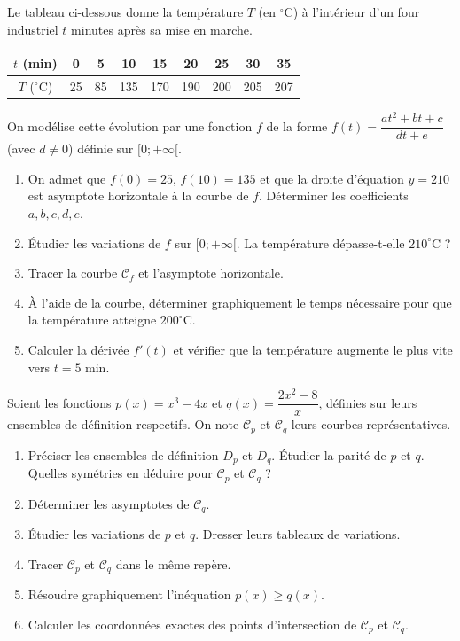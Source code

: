 \documentclass[11pt]{article}
\begin{document}
\begin{exercice}
Le tableau ci-dessous donne la température $T$ (en $^\circ$C) à l'intérieur d'un four industriel $t$ minutes après sa mise en marche.

\begin{center}
\begin{tabular}{|c|c|c|c|c|c|c|c|c|}
\hline
$t$ (min) & 0 & 5 & 10 & 15 & 20 & 25 & 30 & 35 \\
\hline
$T$ ($^\circ$C) & 25 & 85 & 135 & 170 & 190 & 200 & 205 & 207 \\
\hline
\end{tabular}
\end{center}

On modélise cette évolution par une fonction $f$ de la forme $f(t) = \dfrac{at^2 + bt + c}{dt + e}$ (avec $d \neq 0$) définie sur $[0; +\infty[$.
\begin{enumerate}
    \item On admet que $f(0)=25$, $f(10)=135$ et que la droite d'équation $y = 210$ est asymptote horizontale à la courbe de $f$. Déterminer les coefficients $a, b, c, d, e$.
    \item Étudier les variations de $f$ sur $[0; +\infty[$. La température dépasse-t-elle $210^\circ$C ?
    \item Tracer la courbe $\mathcal{C}_f$ et l'asymptote horizontale.
    \item À l'aide de la courbe, déterminer graphiquement le temps nécessaire pour que la température atteigne $200^\circ$C.
    \item Calculer la dérivée $f'(t)$ et vérifier que la température augmente le plus vite vers $t = 5$ min.
\end{enumerate}
\end{exercice}

\begin{exercice}
Soient les fonctions $p(x) = x^3 - 4x$ et $q(x) = \dfrac{2x^2 - 8}{x}$, définies sur leurs ensembles de définition respectifs. On note $\mathcal{C}_p$ et $\mathcal{C}_q$ leurs courbes représentatives.
\begin{enumerate}
    \item Préciser les ensembles de définition $D_p$ et $D_q$. Étudier la parité de $p$ et $q$. Quelles symétries en déduire pour $\mathcal{C}_p$ et $\mathcal{C}_q$ ?
    \item Déterminer les asymptotes de $\mathcal{C}_q$.
    \item Étudier les variations de $p$ et $q$. Dresser leurs tableaux de variations.
    \item Tracer $\mathcal{C}_p$ et $\mathcal{C}_q$ dans le même repère.
    \item Résoudre graphiquement l'inéquation $p(x) \geqslant q(x)$.
    \item Calculer les coordonnées exactes des points d'intersection de $\mathcal{C}_p$ et $\mathcal{C}_q$.
\end{enumerate}
\end{exercice}
\end{document}

